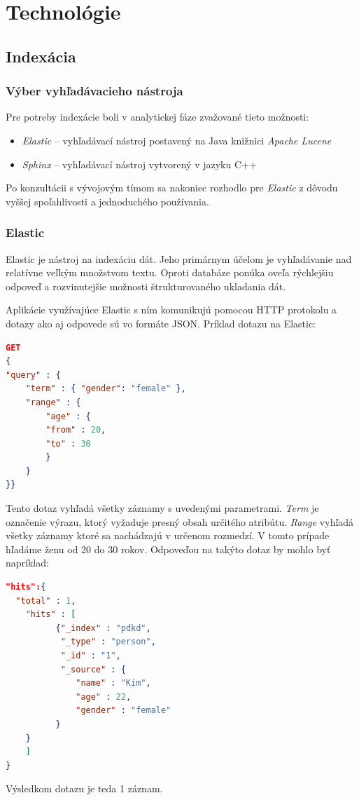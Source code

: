 \documentclass[
  print, %
  table,   %
  lof,     %
  nolot,     %
]{fithesis3}
\begin{document}
\chapter{Technológie}
\section{Indexácia}
\subsection{Výber vyhľadávacieho nástroja}
Pre potreby indexácie boli v analytickej fáze zvažované tieto možnosti:
\begin{itemize}
	\item \textit{Elastic} – vyhľadávací nástroj postavený na Java knižnici \textit{Apache Lucene}
	\item \textit{Sphinx} – vyhľadávací nástroj vytvorený v jazyku C++
\end{itemize}
Po konzultácii s vývojovým tímom sa nakoniec rozhodlo pre \textit{Elastic} z dôvodu vyššej spoľahlivosti a jednoduchého používania.
\subsection{Elastic}
Elastic je nástroj na indexáciu dát. Jeho primárnym účelom je vyhľadávanie nad relatívne veľkým množstvom textu. Oproti databáze ponúka oveľa rýchlejšiu odpoveď a rozvinutejšie možnosti štrukturovaného ukladania dát. 

Aplikácie využívajúce Elastic s ním komunikujú pomocou HTTP protokolu a dotazy ako  aj odpovede sú vo formáte JSON. Príklad dotazu na Elastic:


\begin{lstlisting}[language=json,firstnumber=1]
GET
{
"query" : {
	"term" : { "gender": "female" },
	"range" : {
		"age" : {
		"from" : 20,
		"to" : 30
		}
	} 
}}
	\end{lstlisting}
Tento dotaz vyhľadá všetky záznamy s uvedenými parametrami. \textit{Term} je označenie výrazu, ktorý vyžaduje presný obsah určitého atribútu. \textit{Range} vyhľadá všetky záznamy ktoré sa nachádzajú v určenom rozmedzí. V tomto prípade hľadáme ženu od 20 do 30 rokov. Odpoveďou na takýto dotaz by mohlo byť napríklad:
\begin{lstlisting}[language=json,firstnumber=1]
"hits":{
  "total" : 1, 
	"hits" : [
		  {"_index" : "pdkd",
		   "_type" : "person",
		   "_id" : "1",
		   "_source" : { 
			  "name" : "Kim", 
			  "age" : 22,
			  "gender" : "female" 
		  }
	} 
	]
}
\end{lstlisting}
Výsledkom dotazu je teda 1 záznam.\cite{elastic-reference} 
\end{document}
